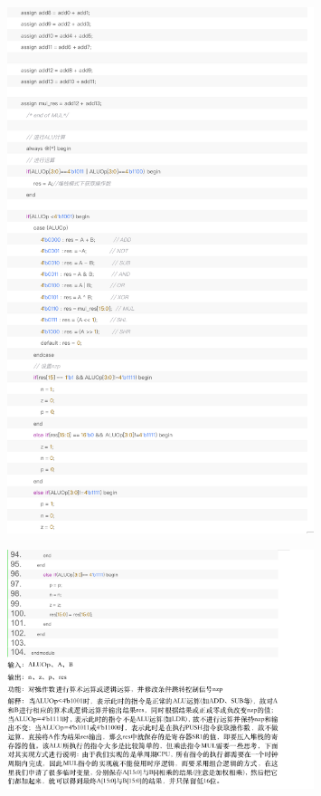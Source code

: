 \documentclass{article}
\begin{document}
    \begin{figure}[H]
        \centering
        \includegraphics[width=0.8\textwidth]{pic/14.png}
      
        \end{figure}

        \begin{figure}[H]
            \centering
            \includegraphics[width=0.8\textwidth]{pic/15.png}
          
            \end{figure}
\end{document}
